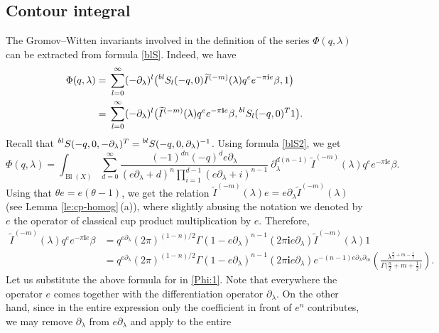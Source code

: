 \documentclass[pdftex]{sigma}
\numberwithin{equation}{section}
\newcommand{\leftexp}[2]{{\vphantom{#2}}^{#1}{#2}}
\newcommand{\ii}{\mathbf{i}}
\begin{document}
\subsection{Contour integral}\label{sec:ci}
The Gromov--Witten invariants involved in the definition of the series $\Phi(q,\lambda)$ can be extracted from formula \eqref{blS}. Indeed, we have
\begin{align*}
\Phi(q,\lambda)={}&
\sum_{l=0}^\infty
(-\partial_\lambda)^l
\big(\leftexp{bl}{S}_l(-q,0) \widetilde{I}^{(-m)}(\lambda) q^{e} e^{-\pi\ii e}\beta,1\big)\\
 ={}&
\sum_{l=0}^\infty
(-\partial_\lambda)^l
\big( \widetilde{I}^{(-m)}(\lambda) q^{e} e^{-\pi\ii e}\beta, \leftexp{bl}{S}_l(-q,0)^T 1\big).
\end{align*}
Recall that $
\leftexp{bl}{S}(-q,0,-\partial_\lambda)^T=
\leftexp{bl}{S}(-q,0,\partial_\lambda)^{-1}$. Using formula \eqref{blS2}, we get
\begin{equation}\label{Phi:1}
\Phi(q,\lambda)=\int_{\operatorname{Bl}(X)}
\sum_{d=0}^\infty
\frac{(-1)^{dn} (-q)^d e \partial_\lambda }{
(e\partial_\lambda+d)^n
\prod_{i=1}^{d-1}(e\partial_\lambda +i)^{n-1} } \
\partial_\lambda^{d(n-1)} \
\widetilde{I}^{(-m)}(\lambda) q^{e} e^{-\pi\ii e}\beta.
\end{equation}
Using that $\theta e= e (\theta-1)$, we get the relation
$\widetilde{I}^{(-m)}(\lambda) e = e\partial_\lambda
\widetilde{I}^{(-m)}(\lambda) $ (see Lemma \ref{le:cp-homog}\,(a)),
where slightly abusing the notation we denoted by $e$ the operator of
classical cup product multiplication by $e$. Therefore,
\begin{align*}
\widetilde{I}^{(-m)}(\lambda) q^{e} e^{-\pi\ii e}\beta & =
q^{e\partial_\lambda}
(2\pi)^{(1-n)/2}
\Gamma(1-e\partial_\lambda )^{n-1}
(2\pi\ii e\partial_\lambda )
\widetilde{I}^{(-m)}(\lambda) 1\\
& =
q^{e\partial_\lambda}
(2\pi)^{(1-n)/2}
\Gamma(1-e\partial_\lambda )^{n-1}
(2\pi\ii e\partial_\lambda )
e^{-(n-1) e \partial_\lambda \partial_m}\!
\left(
\frac{\lambda^{\frac{n}{2}+m-\frac{1}{2} } }{
\Gamma\big( \frac{n}{2}+m+\frac{1}{2} \big) }
\right).
\end{align*}
Let us substitute the above formula for \smash{$\widetilde{I}^{(-m)}(\lambda)
q^{e} e^{-\pi\ii e}\beta$} in \eqref{Phi:1}. Note that everywhere the
operator $e$ comes together with the differentiation operator
$\partial_\lambda$. On the other hand, since in the entire expression only
the coefficient in front of $e^n$ contributes, we may remove
$\partial_\lambda$ from $e\partial_\lambda$ and apply to the entire
\end{document}

